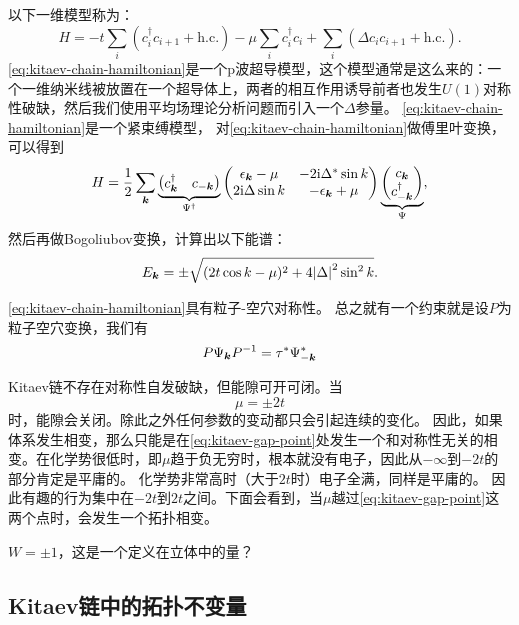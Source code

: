以下一维模型称为：
\begin{equation}
    {H} = - t \sum_{i} ({c}_{i}^\dagger {c}_{i+1} + \text{h.c.}) - \mu \sum_{i} {c}_{i}^\dagger {c}_{i} + \sum_{i} (\Delta {c}_{i} {c}_{i+1} + \text{h.c.} ).
    \label{eq:kitaev-chain-hamiltonian}
\end{equation}
\eqref{eq:kitaev-chain-hamiltonian}是一个p波超导模型，这个模型通常是这么来的：一个一维纳米线被放置在一个超导体上，两者的相互作用诱导前者也发生$U(1)$对称性破缺，然后我们使用平均场理论分析问题而引入一个$\Delta$参量。
\eqref{eq:kitaev-chain-hamiltonian}是一个紧束缚模型，
对\eqref{eq:kitaev-chain-hamiltonian}做傅里叶变换，可以得到
\begin{equation}
    {H} = \frac{1}{2} \sum_{\vb*{k}} \underbrace{\pmqty{{c}^\dagger_{\vb*{k}} & {c}_{-\vb*{k}}}}_{{\Psi}^\dagger} \pmqty{\epsilon_{\vb*{k}} - \mu & -2 \ii \Delta^* \sin k \\ 2 \ii \Delta \sin k & - \epsilon_{\vb*{k}} + \mu} \underbrace{\pmqty{{c}_{\vb*{k}} \\ {c}^\dagger_{-\vb*{k}}}}_{{\Psi}},
\end{equation}
然后再做Bogoliubov变换，计算出以下能谱：
\begin{equation}
    E_{\vb*{k}} = \pm \sqrt{(2t \cos k - \mu)^2 + 4 \abs{\Delta}^2 \sin^2 k}.
\end{equation}

\eqref{eq:kitaev-chain-hamiltonian}具有粒子-空穴对称性。%
总之就有一个约束就是设$P$为粒子空穴变换，我们有
\[
    P {\Psi}_{\vb*{k}} P^{-1} = \tau^* {\Psi}_{-\vb*{k}}^*
\]

Kitaev链不存在对称性自发破缺，但能隙可开可闭。当
\begin{equation}
    \mu = \pm 2t
    \label{eq:kitaev-gap-point}
\end{equation}
时，能隙会关闭。除此之外任何参数的变动都只会引起连续的变化。
因此，如果体系发生相变，那么只能是在\eqref{eq:kitaev-gap-point}处发生一个和对称性无关的相变。在化学势很低时，即$\mu$趋于负无穷时，根本就没有电子，因此从$-\infty$到$-2t$的部分肯定是平庸的。
化学势非常高时（大于$2t$时）电子全满，同样是平庸的。
因此有趣的行为集中在$-2t$到$2t$之间。下面会看到，当$\mu$越过\eqref{eq:kitaev-gap-point}这两个点时，会发生一个拓扑相变。

$W = \pm 1$，这是一个定义在立体中的量？

\subsection{Kitaev链中的拓扑不变量}

